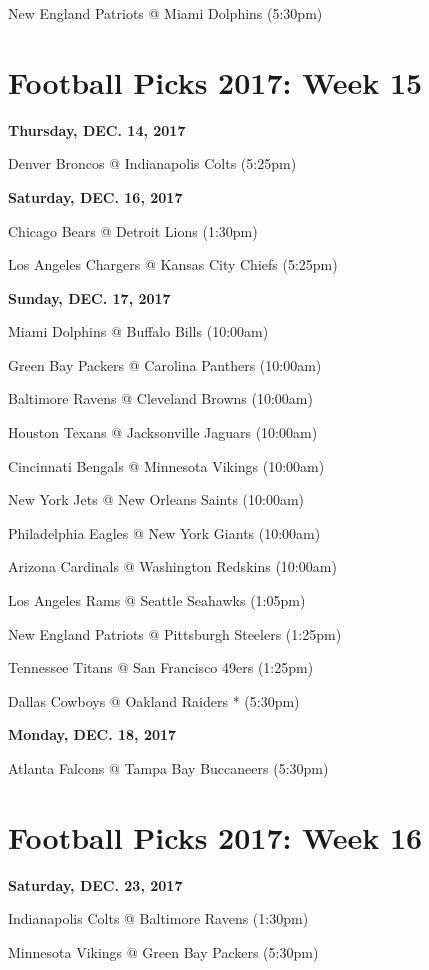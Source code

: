 \documentclass[11pt, letterpaper]{article}
\begin{document}
New England Patriots @ Miami Dolphins (5:30pm)\par
\newpage \section*{\LARGE Football Picks 2017: Week 15}
\noindent \normalsize \textbf{Thursday, DEC.    14, 2017} \par
Denver Broncos @ Indianapolis Colts (5:25pm)\par
\noindent \normalsize \textbf{Saturday, DEC. 16, 2017} \par
Chicago Bears @ Detroit Lions (1:30pm)\par
Los Angeles Chargers @ Kansas City Chiefs (5:25pm)\par
\noindent \normalsize \textbf{Sunday, DEC. 17, 2017} \par
Miami Dolphins @ Buffalo Bills (10:00am)\par
Green Bay Packers @ Carolina Panthers (10:00am)\par
Baltimore Ravens @ Cleveland Browns (10:00am)\par
Houston Texans @ Jacksonville Jaguars (10:00am)\par
Cincinnati Bengals @ Minnesota Vikings (10:00am)\par
New York Jets @ New Orleans Saints (10:00am)\par
Philadelphia Eagles @ New York Giants (10:00am)\par
Arizona Cardinals @ Washington Redskins (10:00am)\par
Los Angeles Rams @ Seattle Seahawks (1:05pm)\par
New England Patriots @ Pittsburgh Steelers (1:25pm)\par
Tennessee Titans @ San Francisco 49ers (1:25pm)\par
Dallas Cowboys @ Oakland Raiders * (5:30pm)\par
\noindent \normalsize \textbf{Monday, DEC. 18, 2017} \par
Atlanta Falcons @ Tampa Bay Buccaneers (5:30pm)\par
\newpage \section*{\LARGE Football Picks 2017: Week 16}
\noindent \normalsize \textbf{Saturday, DEC.    23, 2017} \par
Indianapolis Colts @ Baltimore Ravens (1:30pm)\par
Minnesota Vikings @ Green Bay Packers (5:30pm)\par
\end{document}
